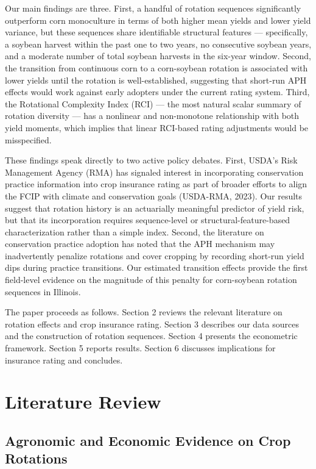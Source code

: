 \documentclass[11pt,letterpaper]{article}
\theoremstyle{remark}
\theoremstyle{plain}
\theoremstyle{definition}
\begin{document}
Our main findings are three. First, a handful of rotation sequences significantly outperform corn monoculture in terms of both higher mean yields and lower yield variance, but these sequences share identifiable structural features — specifically, a soybean harvest within the past one to two years, no consecutive soybean years, and a moderate number of total soybean harvests in the six-year window. Second, the transition from continuous corn to a corn-soybean rotation is associated with lower yields until the rotation is well-established, suggesting that short-run APH effects would work against early adopters under the current rating system. Third, the Rotational Complexity Index (RCI) — the most natural scalar summary of rotation diversity — has a nonlinear and non-monotone relationship with both yield moments, which implies that linear RCI-based rating adjustments would be misspecified.

These findings speak directly to two active policy debates. First, USDA's Risk Management Agency (RMA) has signaled interest in incorporating conservation practice information into crop insurance rating as part of broader efforts to align the FCIP with climate and conservation goals (USDA-RMA, 2023). Our results suggest that rotation history is an actuarially meaningful predictor of yield risk, but that its incorporation requires sequence-level or structural-feature-based characterization rather than a simple index. Second, the literature on conservation practice adoption has noted that the APH mechanism may inadvertently penalize rotations and cover cropping by recording short-run yield dips during practice transitions. Our estimated transition effects provide the first field-level evidence on the magnitude of this penalty for corn-soybean rotation sequences in Illinois.

The paper proceeds as follows. Section 2 reviews the relevant literature on rotation effects and crop insurance rating. Section 3 describes our data sources and the construction of rotation sequences. Section 4 presents the econometric framework. Section 5 reports results. Section 6 discusses implications for insurance rating and concludes.

\section{\label{sec:lit_review}Literature Review}
\subsection{\label{subsec:agronomy}Agronomic and Economic Evidence on Crop Rotations}
\end{document}
